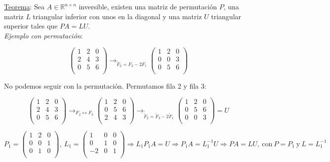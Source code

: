 \underline{Teorema}: Sea $A \in \mathbb{R}^{n \times n}$ inversible, existen una matriz de permutaci\'on $P$, una matriz $L$ triangular inferior con unos en la diagonal y una matriz $U$ triangular superior tales que $PA = LU$.\\

\textit{Ejemplo con permutaci\'on}:

$$
	\begin{pmatrix}
        1 & 2 & 0\\
        2 & 4 & 3\\
        0 & 5 & 6\\
	\end{pmatrix}
	\rightarrow_{
	\tilde{F}_{2} = F_{2} - 2F_{1}}
    \begin{pmatrix}
        1 & 2 & 0\\
        0 & 0 & 3\\
        0 & 5 & 6\\
	\end{pmatrix}
$$

No podemos seguir con la permutaci\'on. Permutamos fila 2 y fila 3:

$$
	\begin{pmatrix}
        1 & 2 & 0\\
        2 & 4 & 3\\
        0 & 5 & 6\\
	\end{pmatrix}
	\rightarrow_{
	F_{2} \leftrightarrow F_{3}}
    \begin{pmatrix}
        1 & 2 & 0\\
        0 & 5 & 6\\
        2 & 4 & 3\\
	\end{pmatrix}
	\rightarrow_{
	\tilde{\tilde{F}}_{2} = \tilde{F}_{3} - 2\tilde{F}_{1}}
	\begin{pmatrix}
        1 & 2 & 0\\
        0 & 5 & 6\\
        0 & 0 & 3\\
	\end{pmatrix} = U
$$

$$ P_{1} = 
	\begin{pmatrix}
        1 & 2 & 0\\
        0 & 0 & 1\\
        0 & 1 & 0\\
	\end{pmatrix}
	,\ L_{1} = 
    \begin{pmatrix}
        1 & 0 & 0\\
        0 & 1 & 0\\
        -2 & 0 & 1\\
	\end{pmatrix}
	\Rightarrow L_{1}P_{1}A = U \Rightarrow P_{1}A = L_{1}^{-1}U \Rightarrow PA = LU,\ \text{con}\ P = P_{1}\ \text{y}\ L = L_{1}^{-1}
$$

